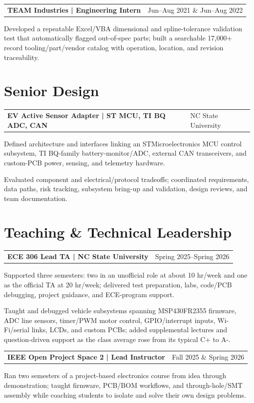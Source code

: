 \documentclass[10pt,letterpaper]{article}
\makeatletter
\newcommand{\resumeentry}[2]{%
  \begin{tabularx}{\textwidth}{@{}X>{\raggedleft\arraybackslash}p{2.40in}@{}}
    \textbf{#1} & #2
  \end{tabularx}\vspace{-0.075cm}
}
\makeatother
\begin{document}
\resumeentry{TEAM Industries | Engineering Intern}{Jun--Aug 2021 \& Jun--Aug 2022}
\begin{resumebullets}
  \item Developed a repeatable Excel/VBA dimensional and spline-tolerance validation test that automatically flagged out-of-spec parts; built a searchable 17,000+ record tooling/part/vendor catalog with operation, location, and revision traceability.
\end{resumebullets}

\section{Senior Design}
\resumeentry{EV Active Sensor Adapter | ST MCU, TI BQ ADC, CAN}{NC State University}
\begin{resumebullets}
  \item Defined architecture and interfaces linking an STMicroelectronics MCU control subsystem, TI BQ-family battery-monitor/ADC, external CAN transceivers, and custom-PCB power, sensing, and telemetry hardware.
  \item Evaluated component and electrical/protocol tradeoffs; coordinated requirements, data paths, risk tracking, subsystem bring-up and validation, design reviews, and team documentation.
\end{resumebullets}

\section{Teaching \& Technical Leadership}
\resumeentry{ECE 306 Lead TA | NC State University}{Spring 2025--Spring 2026}
\begin{resumebullets}
  \item Supported three semesters: two in an unofficial role at about 10 hr/week and one as the official TA at 20 hr/week; delivered test preparation, labs, code/PCB debugging, project guidance, and ECE-program support.
  \item Taught and debugged vehicle subsystems spanning MSP430FR2355 firmware, ADC line sensors, timer/PWM motor control, GPIO/interrupt inputs, Wi-Fi/serial links, LCDs, and custom PCBs; added supplemental lectures and question-driven support as the class average rose from its typical C+ to A-.
\end{resumebullets}

\resumeentry{IEEE Open Project Space 2 | Lead Instructor}{Fall 2025 \& Spring 2026}
\begin{resumebullets}
  \item Ran two semesters of a project-based electronics course from idea through demonstration; taught firmware, PCB/BOM workflows, and through-hole/SMT assembly while coaching students to isolate and solve their own design problems.
\end{resumebullets}
\end{document}
